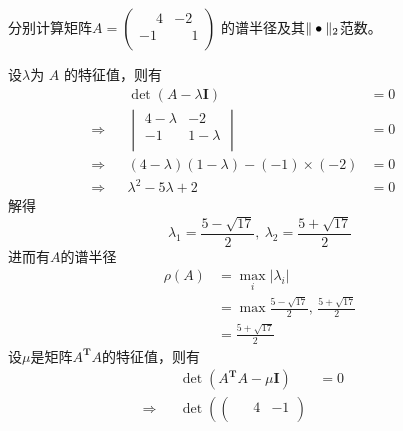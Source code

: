 \documentclass[11pt]{article}
\begin{document}
\begin{question}

    \questiontext
    {
        分别计算矩阵$A =
            \begin{pmatrix}
                \phantom{-}4 & -2           \\
                -1           & \phantom{-}1 \\
            \end{pmatrix}$
        的谱半径及其$\Arrowvert \bullet \Arrowvert_2$范数。
    }

    \answer
    {
        设$\lambda$为 $A$ 的特征值，则有
        \begin{align*}
                        &  & \det{(A - \lambda \mathbf{I})}                & = 0 &  &  & \\
            \Rightarrow &  & \begin{vmatrix}
                4 - \lambda & -2          \\
                -1          & 1 - \lambda \\
            \end{vmatrix}                     & = 0 &  &  & \\
            \Rightarrow &  & (4 - \lambda)(1 - \lambda) - (-1) \times (-2) & = 0 &  &  & \\
            \Rightarrow &  & \lambda^2 - 5 \lambda + 2                     & = 0 &  &  &
        \end{align*}
        解得
        \begin{equation*}
            \lambda_1 = \frac{5-\sqrt{17}}{2},\ \lambda_2 = \frac{5+\sqrt{17}}{2}
        \end{equation*}
        进而有$A$的谱半径
        \begin{align*}
            \rho(A) & = \max_i{|\lambda_i|}                                  \\
                    & = \max{\frac{5-\sqrt{17}}{2},\, \frac{5+\sqrt{17}}{2}} \\
                    & = \frac{5+\sqrt{17}}{2}
        \end{align*}
        设$\mu$是矩阵$A^{\mathbf{T}}\!A$的特征值，则有
        \begin{align*}
                        &  & \det(A^{\mathbf{T}}\!A - \mu\mathbf{I})                                                             & = 0 &  &  & \\
            \Rightarrow &  & \det{\left(\begin{pmatrix}
                    \phantom{-}4 & -1           \\

\end{pmatrix}}
\end{align*}}
\end{question}
\end{document}
